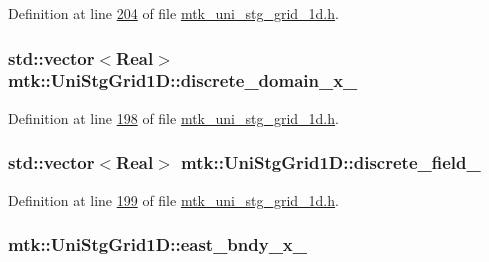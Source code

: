 Definition at line \hyperlink{mtk__uni__stg__grid__1d_8h_source_l00204}{204} of file \hyperlink{mtk__uni__stg__grid__1d_8h_source}{mtk\+\_\+uni\+\_\+stg\+\_\+grid\+\_\+1d.\+h}.

\hypertarget{classmtk_1_1UniStgGrid1D_a0a1f9c00e21659e05f414dd97e2a52e3}{
\subsubsection[{discrete\+\_\+domain\+\_\+x\+\_\+}]{\setlength{\rightskip}{0pt plus 5cm}std\+::vector$<${\bf Real}$>$ mtk\+::\+Uni\+Stg\+Grid1\+D\+::discrete\+\_\+domain\+\_\+x\+\_\+\hspace{0.3cm}{\ttfamily [private]}}}\label{classmtk_1_1UniStgGrid1D_a0a1f9c00e21659e05f414dd97e2a52e3}


Definition at line \hyperlink{mtk__uni__stg__grid__1d_8h_source_l00198}{198} of file \hyperlink{mtk__uni__stg__grid__1d_8h_source}{mtk\+\_\+uni\+\_\+stg\+\_\+grid\+\_\+1d.\+h}.

\hypertarget{classmtk_1_1UniStgGrid1D_a7379a5c6d16210cdd61ffa731bc47edc}{
\subsubsection[{discrete\+\_\+field\+\_\+}]{\setlength{\rightskip}{0pt plus 5cm}std\+::vector$<${\bf Real}$>$ mtk\+::\+Uni\+Stg\+Grid1\+D\+::discrete\+\_\+field\+\_\+\hspace{0.3cm}{\ttfamily [private]}}}\label{classmtk_1_1UniStgGrid1D_a7379a5c6d16210cdd61ffa731bc47edc}


Definition at line \hyperlink{mtk__uni__stg__grid__1d_8h_source_l00199}{199} of file \hyperlink{mtk__uni__stg__grid__1d_8h_source}{mtk\+\_\+uni\+\_\+stg\+\_\+grid\+\_\+1d.\+h}.

\hypertarget{classmtk_1_1UniStgGrid1D_a69a7d6be3171e53177e476348d04f4ae}{
\subsubsection[{east\+\_\+bndy\+\_\+x\+\_\+}]{ mtk\+::\+Uni\+Stg\+Grid1\+D\+::east\+\_\+bndy\+\_\+x\+\_\+\hspace{0.3cm}{\ttfamily [private]}}}\label{classmtk_1_1UniStgGrid1D_a69a7d6be3171e53177e476348d04f4ae}


